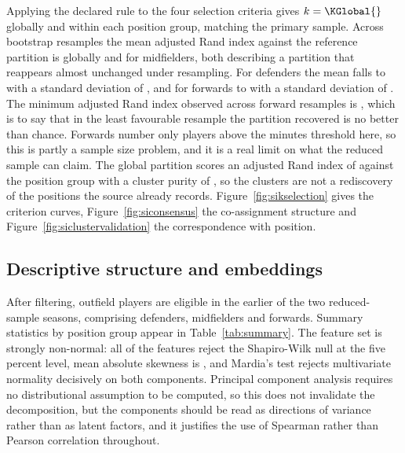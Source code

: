 Applying the declared rule to the four selection criteria gives $k=\KGlobal{}$ globally and
within each position group, matching the primary sample. Across \BootstrapN{} bootstrap
resamples the mean adjusted Rand index against the reference partition is \BootARIGlobal{}
globally and \BootARIMF{} for midfielders, both describing a partition that reappears almost
unchanged under resampling. For defenders the mean falls to \BootARIDF{} with a standard
deviation of \BootARISDDF{}, and for forwards to \BootARIFW{} with a standard deviation of
\BootARISDFW{}. The minimum adjusted Rand index observed across forward resamples is
\BootARIMinFW{}, which is to say that in the least favourable resample the partition recovered
is no better than chance. Forwards number only \NFWPrimary{} players above the minutes threshold
here, so this is partly a sample size problem, and it is a real limit on what the reduced sample
can claim. The global partition scores an adjusted Rand index of \ARIvsPosition{} against the
position group with a cluster purity of \PurityVsPosition{}, so the clusters are not a
rediscovery of the positions the source already records. Figure~\ref{fig:sikselection} gives
the criterion curves, Figure~\ref{fig:siconsensus} the co-assignment structure and
Figure~\ref{fig:siclustervalidation} the correspondence with position.

\subsection{Descriptive structure and embeddings}
\label{sec:si:descriptive}

After filtering, \NEligiblePrimary{} outfield players are eligible in the earlier of the two
reduced-sample seasons, comprising \NDFPrimary{} defenders, \NMFPrimary{} midfielders and
\NFWPrimary{} forwards. Summary statistics by position group appear in Table~\ref{tab:summary}.
The feature set is strongly non-normal: all \NFeaturesRejectNormal{} of the \NFeatures{}
features reject the Shapiro-Wilk null at the five percent level, mean absolute skewness is
\SkewMeanAbs{}, and Mardia's test rejects multivariate normality decisively on both components.
Principal component analysis requires no distributional assumption to be computed, so this does
not invalidate the decomposition, but the components should be read as directions of variance
rather than as latent factors, and it justifies the use of Spearman rather than Pearson
correlation throughout.

